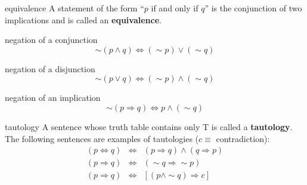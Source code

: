 \documentclass[avery5371,grid]{flashcards}
\begin{document}
\begin{flashcard}[Definition]{equivalence}
A statement of the form ``$p$ if and only if $q$'' is the conjunction
of two implications and is called an \textbf{equivalence}.
\end{flashcard}

\begin{flashcard}[Definition]{negation of a conjunction}
\begin{equation*}
\sim (p \wedge q) \Leftrightarrow (\sim p) \vee (\sim q)
\end{equation*}
\end{flashcard}

\begin{flashcard}[Definition]{negation of a disjunction}
\begin{equation*}
\sim (p \vee q) \Leftrightarrow (\sim p) \wedge (\sim q)
\end{equation*}
\end{flashcard}

\begin{flashcard}[Definition]{negation of an implication}
\begin{equation*}
\sim (p \Rightarrow q) \Leftrightarrow p \wedge (\sim q)
\end{equation*}
\end{flashcard}

\begin{flashcard}[Definition]{tautology}
A sentence whose truth table contains only T is called a \textbf{tautology}.
The following sentences are examples of tautologies
($c \equiv$ contradiction):
\begin{eqnarray*}
(p \Leftrightarrow q) & \Leftrightarrow &
(p\Rightarrow q) \wedge (q\Rightarrow p)\\
(p \Rightarrow q) & \Leftrightarrow &
(\sim q \Rightarrow \sim p)\\
(p \Rightarrow q) & \Leftrightarrow &
\left[(p \wedge \sim q) \Rightarrow c \right]
\end{eqnarray*}
\end{flashcard}
\end{document}
